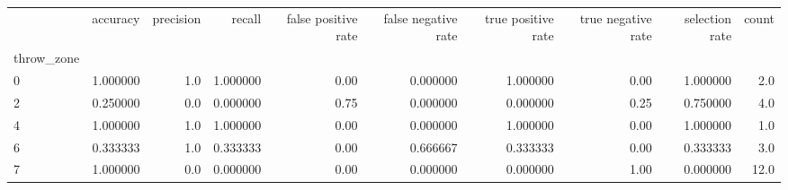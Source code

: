\begin{tabular}{lrrrrrrrrr}
\toprule
{} &  accuracy &  precision &    recall &  false positive rate &  false negative rate &  true positive rate &  true negative rate &  selection rate &  count \\
throw\_zone &           &            &           &                      &                      &                     &                     &                 &        \\
\midrule
0          &  1.000000 &        1.0 &  1.000000 &                 0.00 &             0.000000 &            1.000000 &                0.00 &        1.000000 &    2.0 \\
2          &  0.250000 &        0.0 &  0.000000 &                 0.75 &             0.000000 &            0.000000 &                0.25 &        0.750000 &    4.0 \\
4          &  1.000000 &        1.0 &  1.000000 &                 0.00 &             0.000000 &            1.000000 &                0.00 &        1.000000 &    1.0 \\
6          &  0.333333 &        1.0 &  0.333333 &                 0.00 &             0.666667 &            0.333333 &                0.00 &        0.333333 &    3.0 \\
7          &  1.000000 &        0.0 &  0.000000 &                 0.00 &             0.000000 &            0.000000 &                1.00 &        0.000000 &   12.0 \\
\bottomrule
\end{tabular}
